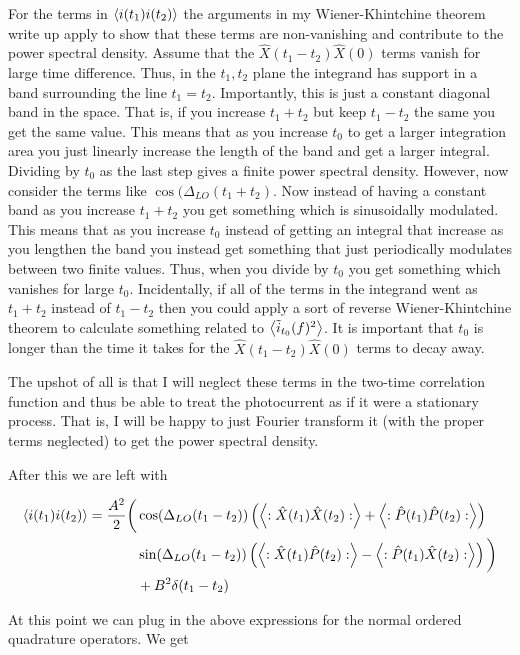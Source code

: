 \documentclass[12pt]{article}
\begin{document}
For the terms in $\Braket{i(t_1)i(t_2)}$ the arguments in my Wiener-Khintchine theorem write up apply to show that these terms are non-vanishing and contribute to the power spectral density. Assume that the $\hat{X}(t_1-t_2)\hat{X}(0)$ terms vanish for large time difference. Thus, in the $t_1, t_2$ plane the integrand has support in a band surrounding the line $t_1 = t_2$. Importantly, this is just a constant diagonal band in the space. That is, if you increase $t_1+t_2$ but keep $t_1-t_2$ the same you get the same value. This means that as you increase $t_0$ to get a larger integration area you just linearly increase the length of the band and get a larger integral. Dividing by $t_0$ as the last step gives a finite power spectral density. However, now consider the terms like $\cos(\Delta_{LO}(t_1+t_2)$. Now instead of having a constant band as you increase $t_1+t_2$ you get something which is sinusoidally modulated. This means that as you increase $t_0$ instead of getting an integral that increase as you lengthen the band you instead get something that just periodically modulates between two finite values. Thus, when you divide by $t_0$ you get something which vanishes for large $t_0$. Incidentally, if all of the terms in the integrand went as $t_1+t_2$ instead of $t_1-t_2$ then you could apply a sort of reverse Wiener-Khintchine theorem to calculate something related to $\Braket{\tilde{i}_{t_0}(f)^2}$. It is important that $t_0$ is longer than the time it takes for the  $\hat{X}(t_1-t_2)\hat{X}(0)$ terms to decay away.

The upshot of all is that I will neglect these terms in the two-time correlation function and thus be able to treat the photocurrent as if it were a stationary process. That is, I will be happy to just Fourier transform it (with the proper terms neglected) to get the power spectral density.

After this we are left with

\begin{align}
\Braket{i(t_1)i(t_2)} = \frac{A^2}{2} \bigg(
&\cos(\Delta_{LO}(t_1-t_2))\left(\Braket{:\hat{X}(t_1)\hat{X}(t_2):} + \Braket{:\hat{P}(t_1)\hat{P}(t_2):}\right)\\
&\sin(\Delta_{LO}(t_1-t_2))\left(\Braket{:\hat{X}(t_1)\hat{P}(t_2):} - \Braket{:\hat{P}(t_1)\hat{X}(t_2):}\right)\bigg)\\
&+B^2\delta(t_1-t_2)
\end{align}

At this point we can plug in the above expressions for the normal ordered quadrature operators. We get
\end{document}
